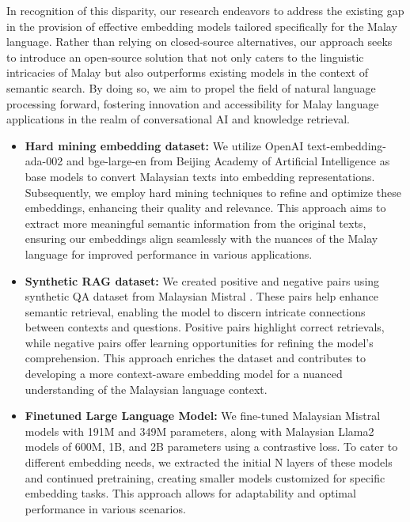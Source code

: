 \documentclass[preprint]{article}
\begin{document}
In recognition of this disparity, our research endeavors to address the existing gap in the provision of effective embedding models tailored specifically for the Malay language. Rather than relying on closed-source alternatives, our approach seeks to introduce an open-source solution that not only caters to the linguistic intricacies of Malay but also outperforms existing models in the context of semantic search. By doing so, we aim to propel the field of natural language processing forward, fostering innovation and accessibility for Malay language applications in the realm of conversational AI and knowledge retrieval.

\begin{itemize}
  \item \textbf{Hard mining embedding dataset:} We utilize OpenAI text-embedding-ada-002 and bge-large-en \cite{bge_embedding} from Beijing Academy of Artificial Intelligence as base models to convert Malaysian texts into embedding representations. Subsequently, we employ hard mining techniques to refine and optimize these embeddings, enhancing their quality and relevance. This approach aims to extract more meaningful semantic information from the original texts, ensuring our embeddings align seamlessly with the nuances of the Malay language for improved performance in various applications.

  \item \textbf{Synthetic RAG dataset:} We created positive and negative pairs using synthetic QA dataset from Malaysian Mistral \cite{zolkepli2024large}. These pairs help enhance semantic retrieval, enabling the model to discern intricate connections between contexts and questions. Positive pairs highlight correct retrievals, while negative pairs offer learning opportunities for refining the model's comprehension. This approach enriches the dataset and contributes to developing a more context-aware embedding model for a nuanced understanding of the Malaysian language context.

  \item \textbf{Finetuned Large Language Model:} We fine-tuned Malaysian Mistral \cite{zolkepli2024large} models with 191M and 349M parameters, along with Malaysian Llama2 models of 600M, 1B, and 2B parameters using a contrastive loss. To cater to different embedding needs, we extracted the initial N layers of these models and continued pretraining, creating smaller models customized for specific embedding tasks. This approach allows for adaptability and optimal performance in various scenarios.
\end{itemize}
\end{document}
